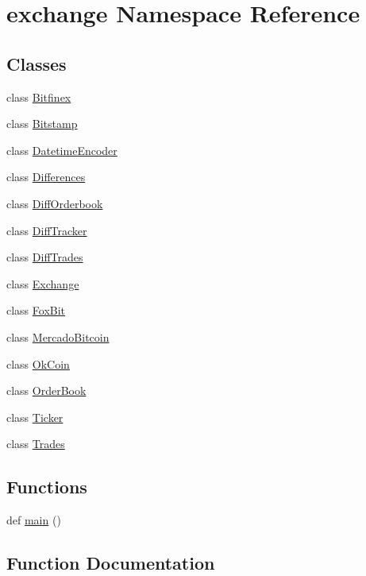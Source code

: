 \hypertarget{namespaceexchange}{}\section{exchange Namespace Reference}
\label{namespaceexchange}
\subsection*{Classes}
\begin{DoxyCompactItemize}
\item 
class \hyperlink{classexchange_1_1_bitfinex}{Bitfinex}
\item 
class \hyperlink{classexchange_1_1_bitstamp}{Bitstamp}
\item 
class \hyperlink{classexchange_1_1_datetime_encoder}{Datetime\+Encoder}
\item 
class \hyperlink{classexchange_1_1_differences}{Differences}
\item 
class \hyperlink{classexchange_1_1_diff_orderbook}{Diff\+Orderbook}
\item 
class \hyperlink{classexchange_1_1_diff_tracker}{Diff\+Tracker}
\item 
class \hyperlink{classexchange_1_1_diff_trades}{Diff\+Trades}
\item 
class \hyperlink{classexchange_1_1_exchange}{Exchange}
\item 
class \hyperlink{classexchange_1_1_fox_bit}{Fox\+Bit}
\item 
class \hyperlink{classexchange_1_1_mercado_bitcoin}{Mercado\+Bitcoin}
\item 
class \hyperlink{classexchange_1_1_ok_coin}{Ok\+Coin}
\item 
class \hyperlink{classexchange_1_1_order_book}{Order\+Book}
\item 
class \hyperlink{classexchange_1_1_ticker}{Ticker}
\item 
class \hyperlink{classexchange_1_1_trades}{Trades}
\end{DoxyCompactItemize}
\subsection*{Functions}
\begin{DoxyCompactItemize}
\item 
def \hyperlink{namespaceexchange_aa5b6297f878f52d360f5c42066aa097b}{main} ()
\end{DoxyCompactItemize}


\subsection{Function Documentation}
